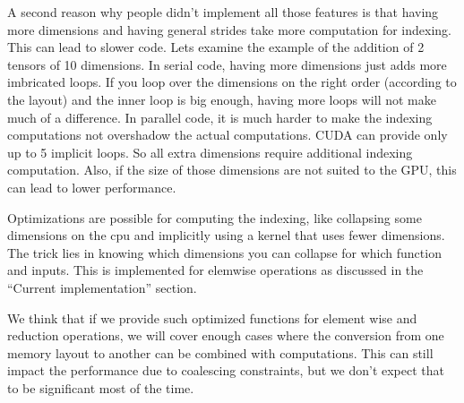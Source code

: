 \documentclass{article} %
\begin{document}

A second reason why people didn't implement all those features is
that having more dimensions and having general strides take more
computation for indexing. This can lead to slower code. Lets examine the example of the addition of 2 tensors of 10 dimensions.
In serial code, having more dimensions just adds more imbricated loops.  
If you loop over the dimensions on the right order (according to the layout) and the inner loop is big enough, having more loops will not make much of a difference.
In parallel code, it is much harder to make the indexing computations not overshadow the actual computations. 
CUDA can provide only up to 5 implicit loops. So all extra dimensions require
additional indexing computation. Also, if the size of those dimensions
are not suited to the GPU, this can lead to lower performance.

Optimizations are possible for computing the indexing, like
collapsing some dimensions on the cpu and implicitly using a kernel
that uses fewer dimensions. The trick lies in knowing which 
dimensions you can collapse for which function and inputs. This is
implemented for elemwise operations as discussed in the ``Current
implementation'' section.

We think that if we provide such optimized functions for element wise and
reduction operations, we will cover enough cases where the conversion from
one memory layout to another can be combined with computations. This
can still impact the performance due to coalescing constraints, but we
don't expect that to be significant most of the time.

\end{document}
